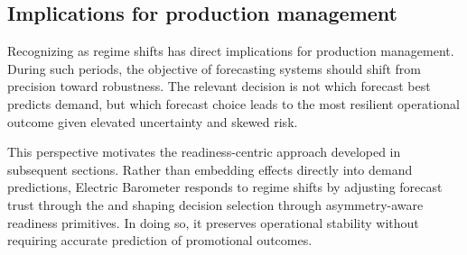 \subsection{Implications for production management}
\label{subsec:regime-implications}

Recognizing \LTOs{} as regime shifts has direct implications for production management. During
such periods, the objective of forecasting systems should shift from precision toward robustness.
The relevant decision is not which forecast best predicts demand, but which forecast choice leads
to the most resilient operational outcome given elevated uncertainty and skewed risk.

This perspective motivates the readiness-centric approach developed in subsequent sections.
Rather than embedding \LTO{} effects directly into demand predictions, Electric Barometer
responds to regime shifts by adjusting forecast trust through the \RAL{} and shaping decision
selection through asymmetry-aware readiness primitives. In doing so, it preserves operational
stability without requiring accurate prediction of promotional outcomes.
